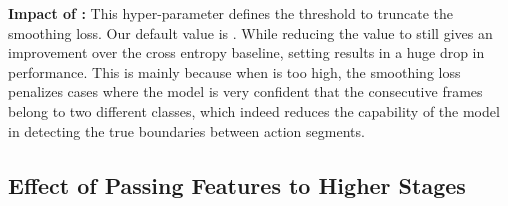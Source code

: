 \documentclass[10pt,twocolumn,letterpaper]{article}
\begin{document}
\noindent\textbf{Impact of :} This hyper-parameter defines the threshold to truncate 
the smoothing loss. Our default value is . While reducing the value to  
still gives an improvement over the cross entropy baseline, setting  results 
in a huge drop in performance. This is mainly because when  is too high, the smoothing 
loss penalizes cases where the model is very confident that the consecutive frames 
belong to two different classes, which indeed reduces the capability of the model in 
detecting the true boundaries between action segments.

\begin{table}[tb]
\centering
{}
\caption{Impact of  and  on the 50Salads dataset.}
\label{tab:impact_lambda_tau}
\end{table}


\subsection{Effect of Passing Features to Higher Stages}

\begin{table}[tb]
\centering
{}
\caption{Effect of passing features to higher stages on the 50Salads dataset.}
\label{tab:features}
\end{table}
\end{document}
